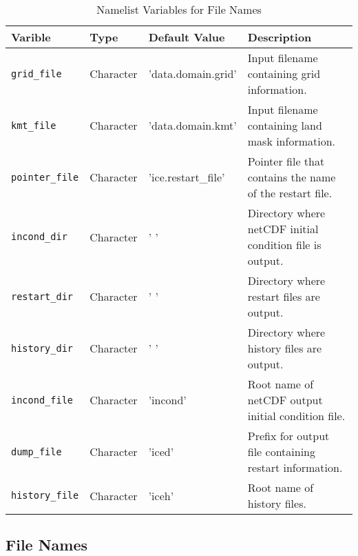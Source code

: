 \begin{table}
  \begin{center}
  \caption{Namelist Variables for File Names}
  \label{table:nml_file_info}
  \begin{tabular}{p{2.5cm}p{2.5cm}p{3cm}p{6.0cm}} \hline
  Varible & Type & Default Value & Description               \\
\hline \hline

{\tt grid\_file} &  Character & 'data.domain.grid' &  Input filename
                                           containing grid information. \\

{\tt kmt\_file} &  Character & 'data.domain.kmt' &  Input filename
                                       containing land mask information. \\

{\tt pointer\_file} & Character & 'ice.restart\_file' & Pointer file that
                                   contains the name of the restart file. \\

{\tt incond\_dir} & Character & ' ' & Directory where netCDF
           initial condition file is output. \\

{\tt restart\_dir} & Character & ' ' & Directory where restart 
           files are output. \\

{\tt history\_dir} & Character & ' ' & Directory where history 
           files are output. \\

{\tt incond\_file} & Character & 'incond' & Root name of netCDF
    output initial condition file. \\

{\tt dump\_file} &  Character & 'iced' &  Prefix for output file
                                             containing restart information. \\

{\tt history\_file} & Character & 'iceh' & Root name of history 
           files. \\
  \hline
  \end{tabular}
  \end{center}
\end{table}

\subsection{File Names}

